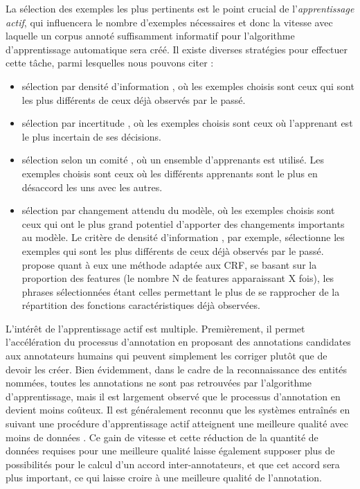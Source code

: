 \documentclass[12pt,a4paper,times,twoside,openright]{report}
\begin{document}
La sélection des exemples les plus pertinents est le point crucial de l'\textit{apprentissage actif}, qui influencera le nombre d'exemples nécessaires et donc la vitesse avec laquelle un corpus annoté suffisamment informatif pour l'algorithme d'apprentissage automatique sera créé. Il existe diverses stratégies pour effectuer cette tâche, parmi lesquelles nous pouvons citer :

\begin{itemize}
    \item sélection par densité d'information \citep{settles2008analysis}, où les exemples choisis sont ceux qui sont les plus différents de ceux déjà observés par le passé.
    \item sélection par incertitude \citep{lewis1994sequential}, où les exemples choisis sont ceux où l'apprenant est le plus incertain de ses décisions.
    \item sélection selon un comité \citep{mamitsuka1998query}, où un ensemble d'apprenants est utilisé. Les exemples choisis sont ceux où les différents apprenants sont le plus en désaccord les uns avec les autres.
    \item sélection par changement attendu du modèle, où les exemples choisis sont ceux qui ont le plus grand potentiel d'apporter des changements importants au modèle. Le critère de densité d'information \citep{settles2008analysis}, par exemple, sélectionne les exemples qui sont les plus différents de ceux déjà observés par le passé. \citet{claveau2017strategies} propose quant à eux une méthode adaptée aux CRF, se basant sur la proportion des features (le nombre N de features apparaissant X fois), les phrases sélectionnées étant celles permettant le plus de se rapprocher de la répartition des fonctions caractéristiques déjà observées.
\end{itemize}

L'intérêt de l'apprentissage actif est multiple. Premièrement, il permet l'accélération du processus d'annotation en proposant des annotations candidates aux annotateurs humains qui peuvent simplement les corriger plutôt que de devoir les créer. Bien évidemment, dans le cadre de la reconnaissance des entités nommées, toutes les annotations ne sont pas retrouvées par l'algorithme d'apprentissage, mais il est largement observé que le processus d'annotation en devient moins coûteux. Il est généralement reconnu que les systèmes entraînés en suivant une procédure d'apprentissage actif atteignent une meilleure qualité avec moins de données \citep{settles2011theories}. Ce gain de vitesse et cette réduction de la quantité de données requises pour une meilleure qualité laisse également supposer plus de possibilités pour le calcul d'un accord inter-annotateurs, et que cet accord sera plus important, ce qui laisse croire à une meilleure qualité de l'annotation.
\end{document}
